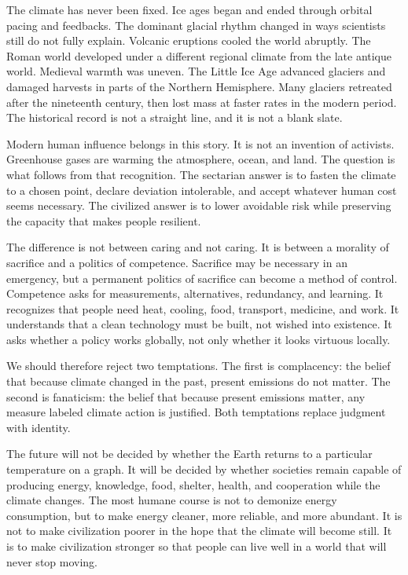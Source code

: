 ﻿\documentclass[12pt,a4paper]{book}
\begin{document}
The climate has never been fixed. Ice ages began and ended through orbital pacing and feedbacks. The dominant glacial rhythm changed in ways scientists still do not fully explain. Volcanic eruptions cooled the world abruptly. The Roman world developed under a different regional climate from the late antique world. Medieval warmth was uneven. The Little Ice Age advanced glaciers and damaged harvests in parts of the Northern Hemisphere. Many glaciers retreated after the nineteenth century, then lost mass at faster rates in the modern period. The historical record is not a straight line, and it is not a blank slate.

Modern human influence belongs in this story. It is not an invention of activists. Greenhouse gases are warming the atmosphere, ocean, and land. The question is what follows from that recognition. The sectarian answer is to fasten the climate to a chosen point, declare deviation intolerable, and accept whatever human cost seems necessary. The civilized answer is to lower avoidable risk while preserving the capacity that makes people resilient.

The difference is not between caring and not caring. It is between a morality of sacrifice and a politics of competence. Sacrifice may be necessary in an emergency, but a permanent politics of sacrifice can become a method of control. Competence asks for measurements, alternatives, redundancy, and learning. It recognizes that people need heat, cooling, food, transport, medicine, and work. It understands that a clean technology must be built, not wished into existence. It asks whether a policy works globally, not only whether it looks virtuous locally.

We should therefore reject two temptations. The first is complacency: the belief that because climate changed in the past, present emissions do not matter. The second is fanaticism: the belief that because present emissions matter, any measure labeled climate action is justified. Both temptations replace judgment with identity.

The future will not be decided by whether the Earth returns to a particular temperature on a graph. It will be decided by whether societies remain capable of producing energy, knowledge, food, shelter, health, and cooperation while the climate changes. The most humane course is not to demonize energy consumption, but to make energy cleaner, more reliable, and more abundant. It is not to make civilization poorer in the hope that the climate will become still. It is to make civilization stronger so that people can live well in a world that will never stop moving.
\end{document}
